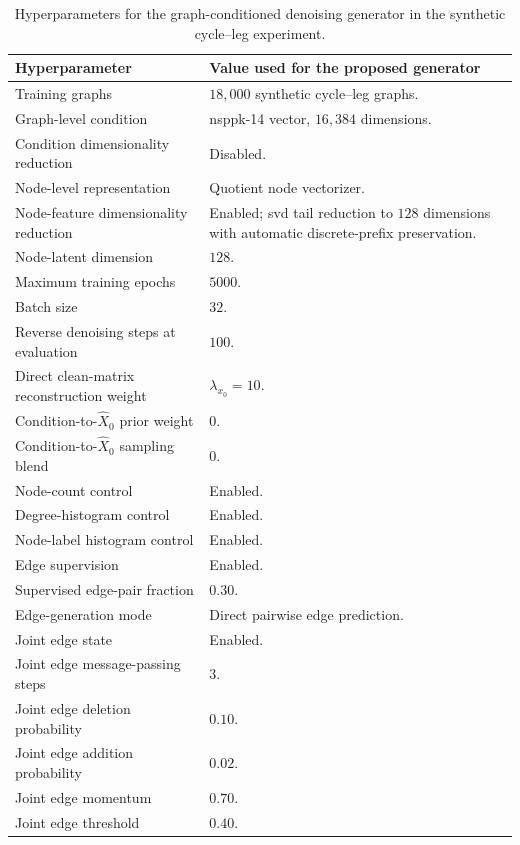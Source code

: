 \begin{table}[p]
\centering
\footnotesize
\begin{tabularx}{\textwidth}{@{}p{}X@{}}
\toprule
Hyperparameter & Value used for the proposed generator \\
\midrule
Training graphs & \(18{,}000\) synthetic cycle--leg graphs. \\
Graph-level condition & \gls{nsppk}-14 vector, \(16{,}384\) dimensions. \\
Condition dimensionality reduction & Disabled. \\
Node-level representation & Quotient node vectorizer. \\
Node-feature dimensionality reduction & Enabled; \gls{svd} tail reduction to \(128\) dimensions with automatic discrete-prefix preservation. \\
Node-latent dimension & \(128\). \\
Maximum training epochs & \(5000\). \\
Batch size & \(32\). \\
Reverse denoising steps at evaluation & \(100\). \\
Direct clean-matrix reconstruction weight & \(\lambda_{x_0}=10\). \\
Condition-to-\(\hat X_0\) prior weight & \(0\). \\
Condition-to-\(\hat X_0\) sampling blend & \(0\). \\
Node-count control & Enabled. \\
Degree-histogram control & Enabled. \\
Node-label histogram control & Enabled. \\
Edge supervision & Enabled. \\
Supervised edge-pair fraction & \(0.30\). \\
Edge-generation mode & Direct pairwise edge prediction. \\
Joint edge state & Enabled. \\
Joint edge message-passing steps & \(3\). \\
Joint edge deletion probability & \(0.10\). \\
Joint edge addition probability & \(0.02\). \\
Joint edge momentum & \(0.70\). \\
Joint edge threshold & \(0.40\). \\
\bottomrule
\end{tabularx}
\caption{Hyperparameters for the graph-conditioned denoising generator in the synthetic cycle--leg experiment.}
\label{tab:synthetic-cycle-leg-proposed-hyperparameters}
\end{table}

